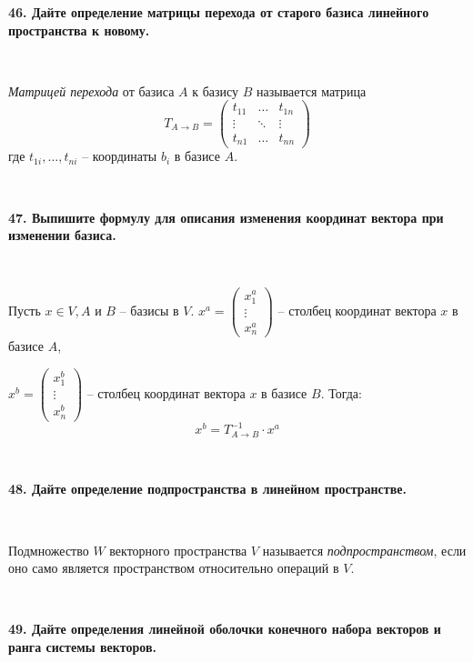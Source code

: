 \documentclass{article}
\begin{document}
	\textbf{46. Дайте определение матрицы перехода от старого базиса линейного пространства к новому.}
	
	{
		$\;$
		\setlength{\parindent}{0.4cm}
		\hangindent=0.4cm
		
		\textit{Матрицей перехода} от базиса $A$ к базису $B$ называется матрица
		\[
		T_{A\rightarrow B}=\begin{pmatrix}
		t_{11}&\ldots&t_{1n}\\
		\vdots&\ddots&\vdots\\
		t_{n1}&\ldots&t_{nn}
		\end{pmatrix}
		\]
		где $t_{1i}, \ldots, t_{ni}$ -- координаты $b_i$ в базисе $A$.
		
		$\;$
		\setlength{\parindent}{0cm}
		\hangindent=0cm
	}
	
	\newpage
	
	\textbf{47. Выпишите формулу для описания изменения координат вектора при изменении базиса.}
	
	{
		$\;$
		\setlength{\parindent}{0.4cm}
		\hangindent=0.4cm
		
		Пусть $x\in V, A$ и $B$ -- базисы в $V$. $x^a=\begin{pmatrix}
		x_1^a\\
		\vdots\\
		x_n^a
		\end{pmatrix}$ -- столбец координат вектора $x$ в базисе $A$, 
		
		$x^b=\begin{pmatrix}
		x_1^b\\
		\vdots\\
		x_n^b
		\end{pmatrix}$ -- столбец координат вектора $x$ в базисе $B$. Тогда: $$x^b=T_{A\rightarrow B}^{-1}\cdot x^a$$
		
		$\;$
		\setlength{\parindent}{0cm}
		\hangindent=0cm
	}
	
	\textbf{48. Дайте определение подпространства в линейном пространстве.}
	
	{
		$\;$
		\setlength{\parindent}{0.4cm}
		\hangindent=0.4cm
		
		Подмножество $W$ векторного пространства $V$ называется \textit{подпространством}, если оно само	является пространством относительно операций в $V$.
		
		$\;$
		\setlength{\parindent}{0cm}
		\hangindent=0cm
	}
	
	\textbf{49. Дайте определения линейной оболочки конечного набора векторов и ранга системы векторов.}
	
\end{document}
